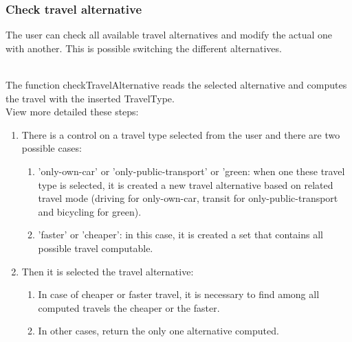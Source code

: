 \subsubsection{Check travel alternative}
\label{subsec:algTravelAlternative}
The user can check all available travel alternatives and modify the actual one with another. This is possible switching the different alternatives.
\begin{figure}[!h]
	\centering
\end{figure}
\\The function checkTravelAlternative reads the selected alternative and computes the travel with the inserted TravelType.
\\View more detailed these steps:
\begin{enumerate}
	\item There is a control on a travel type selected from the user and there are two possible cases:
		\begin{enumerate}
			\item 'only-own-car' or 'only-public-transport' or 'green:
				when one these travel type is selected, it is created a new travel alternative based on related travel mode (driving for only-own-car, transit for only-public-transport and bicycling for green).
			\item 'faster' or 'cheaper':  in this case, it is created a set that contains all possible travel computable.
		\end{enumerate}
	\item Then it is selected the travel alternative:
		\begin{enumerate}
			\item In case of cheaper or faster travel, it is necessary to find among all computed travels the cheaper or the faster.
			\item In other cases, return the only one alternative computed.
		\end{enumerate}
\end{enumerate}

